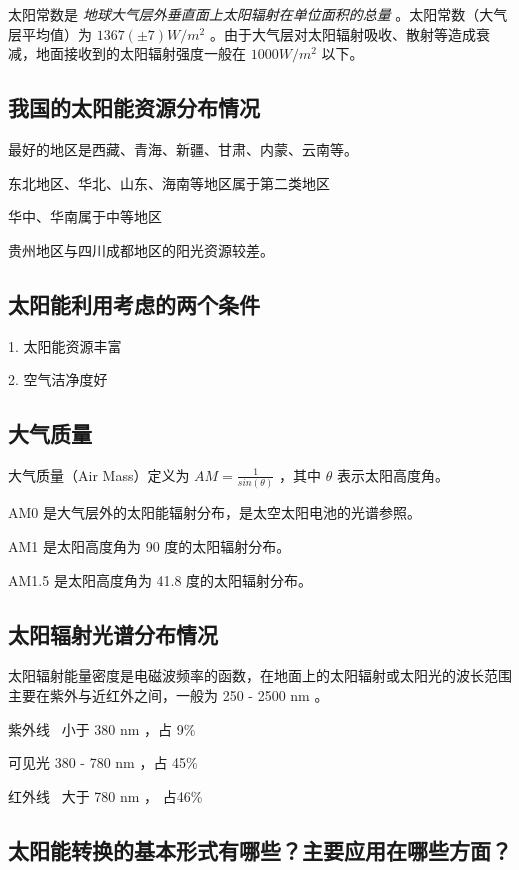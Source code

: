 \documentclass{article}
\begin{document}
太阳常数是 \emph{地球大气层外垂直面上太阳辐射在单位面积的总量} 。太阳常数（大气层平均值）为 $1367 (\pm 7) W / m^2$ 。由于大气层对太阳辐射吸收、散射等造成衰减，地面接收到的太阳辐射强度一般在 $1000 W / m^2$ 以下。

\subsection{我国的太阳能资源分布情况}

最好的地区是西藏、青海、新疆、甘肃、内蒙、云南等。

东北地区、华北、山东、海南等地区属于第二类地区

华中、华南属于中等地区

贵州地区与四川成都地区的阳光资源较差。

\subsection{太阳能利用考虑的两个条件}

1. 太阳能资源丰富

2. 空气洁净度好

\subsection{大气质量}

大气质量（Air Mass）定义为 $AM = \frac{1}{sin( \theta )}$ ，其中 $\theta$ 表示太阳高度角。

AM0 是大气层外的太阳能辐射分布，是太空太阳电池的光谱参照。

AM1 是太阳高度角为 90 度的太阳辐射分布。

AM1.5 是太阳高度角为 41.8 度的太阳辐射分布。

\subsection{太阳辐射光谱分布情况}

太阳辐射能量密度是电磁波频率的函数，在地面上的太阳辐射或太阳光的波长范围主要在紫外与近红外之间，一般为 250 - 2500 nm 。

紫外线 \ 小于 380 nm ，占 9\%

可见光 380 - 780 nm ，占 45\%

红外线 \ 大于 780 nm ， 占46\%

\subsection{太阳能转换的基本形式有哪些？主要应用在哪些方面？}
\end{document}
